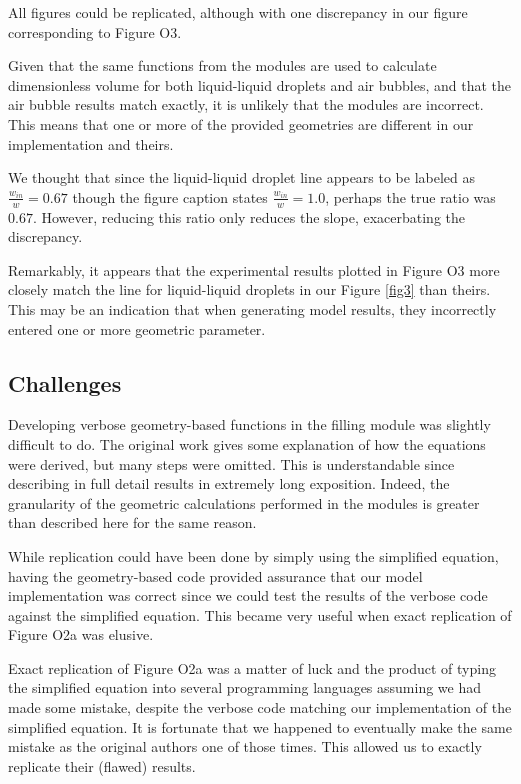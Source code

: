 All figures could be replicated, although with one discrepancy in our figure corresponding to 
Figure O3.

Given that the same functions from the modules are used to calculate dimensionless volume for both
liquid-liquid droplets and air bubbles, and that the air bubble results match exactly, it is
unlikely that the modules are incorrect. This means that one or more of the provided geometries
are different in our implementation and theirs.

We thought that since the liquid-liquid droplet line appears to be labeled
as $\frac{w_{in}}{w}=0.67$ though the figure caption states $\frac{w_{in}}{w}=1.0$,
perhaps the true ratio was $0.67$. However, reducing this ratio only reduces the slope,
exacerbating the discrepancy.

Remarkably, it appears that the experimental results plotted in Figure O3
more closely match the line for liquid-liquid droplets in our Figure \ref{fig3}
than theirs. This may be an indication that when generating model results, they incorrectly
entered one or more geometric parameter.

\subsection{Challenges}

Developing verbose geometry-based functions in the filling module was slightly difficult to do.
The original work gives some explanation of how the equations were derived, but many steps were
omitted. This is understandable since describing in full detail results in extremely long
exposition. Indeed, the granularity of the geometric calculations performed in the modules
is greater than described here for the same reason.

While replication could have been done by simply using the simplified equation, having
the geometry-based code provided assurance that our model implementation was correct since
we could test the results of the verbose code against the simplified equation. This became very
useful when exact replication of Figure O2a was elusive.

Exact replication of Figure O2a was a matter of luck and the product of typing the simplified
equation into several programming languages assuming we had made some mistake, despite the
verbose code matching our implementation of the simplified equation. It is fortunate that we
happened to eventually make the same mistake as the original authors one of those times. This
allowed us to exactly replicate their (flawed) results.

